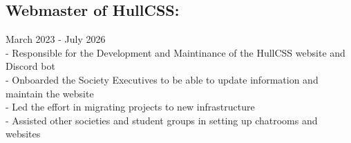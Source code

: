 \subsection{Webmaster of HullCSS:} March 2023 - July 2026 \\
-\: Responsible for the Development and Maintinance of the HullCSS website and Discord bot \\
-\: Onboarded the Society Executives to be able to update information and maintain the website \\
-\: Led the effort in migrating projects to new infrastructure \\
-\: Assisted other societies and student groups in setting up chatrooms and websites \\

